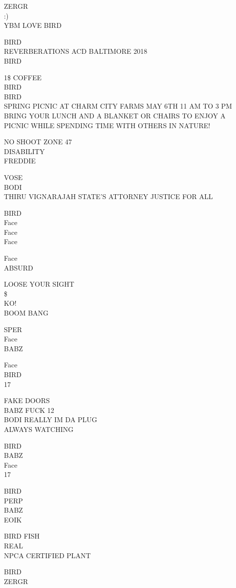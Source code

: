 \documentclass[10pt,letterpaper]{article}
\begin{document}
ZERGR\\
:)\\
YBM LOVE BIRD

BIRD\\
REVERBERATIONS ACD BALTIMORE 2018\\
BIRD

1\$ COFFEE\\
BIRD\\
BIRD\\
SPRING PICNIC AT CHARM CITY FARMS MAY 6TH 11 AM TO 3 PM BRING YOUR LUNCH AND A BLANKET OR CHAIRS TO ENJOY A PICNIC WHILE SPENDING TIME WITH OTHERS IN NATURE!

NO SHOOT ZONE 47\\
DISABILITY\\
FREDDIE

VOSE\\
BODI\\
THIRU VIGNARAJAH STATE'S ATTORNEY JUSTICE FOR ALL

BIRD\\
Face\\
Face\\
Face

Face\\
ABSURD

LOOSE YOUR SIGHT\\
\$\\
KO!\\
BOOM BANG

SPER\\
Face\\
BABZ

Face\\
BIRD\\
17

FAKE DOORS\\
BABZ FUCK 12\\
BODI REALLY IM DA PLUG\\
ALWAYS WATCHING

BIRD\\
BABZ\\
Face\\
17

BIRD\\
PERP\\
BABZ\\
EOIK

BIRD FISH\\
REAL\\
NPCA CERTIFIED PLANT

BIRD\\
ZERGR
\end{document}
